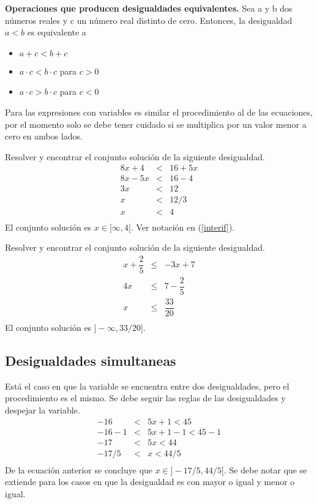 \begin{myexample}
\textbf{Operaciones que producen desigualdades equivalentes.} Sea a y b dos números reales y c un número real distinto de cero. Entonces, la desigualdad $a<b$ es equivalente a
\begin{itemize}
	\item $a+c<b+c$
	\item $a\cdot c <b\cdot c $ para $c>0$
	\item $a\cdot c >b\cdot c $ para $c<0$
\end{itemize}
\end{myexample}
Para las expresiones con variables es similar el procedimiento al de las ecuaciones, por el momento solo se debe tener cuidado si se multiplica por un valor menor a cero en ambos lados.\\
\begin{myexample}
Resolver y encontrar el conjunto solución de la siguiente desigualdad.
\begin{eqnarray*}
8x+4&<&16+5x\\
8x-5x&<&16-4\\
3x&<&12\\
x&<&12/3\\
x&<&4\\
\end{eqnarray*}
El conjunto solución es $x\in ]\infty,4[$. Ver notación en (\ref{interif}). 
\end{myexample}

\begin{myexample}
Resolver y encontrar el conjunto solución de la siguiente desigualdad.
\begin{eqnarray*}
x+\dfrac{2}{5} &\leq& -3x +7\\
4x &\leq&  7-\dfrac{2}{5}\\
x &\leq&  \dfrac{33}{20}\\
\end{eqnarray*}
El conjunto solución es $]-\infty,33/20]$.
\end{myexample}

\subsection{Desigualdades simultaneas}
Está el caso en que la variable se encuentra entre dos desigualdades, pero el procedimiento es el mismo. Se debe seguir las reglas de las desigualdades y despejar la variable.
\begin{eqnarray*}
-16&<&5x+1<45\\
-16-1&<&5x+1-1<45-1\\
-17&<&5x<44\\
-17/5&<&x<44/5\\
\end{eqnarray*}
De la ecuación anterior se concluye que $x\in ]-17/5,44/5[$. Se debe notar que se extiende para los casos en que la desigualdad es con mayor o igual y menor o igual.\\


